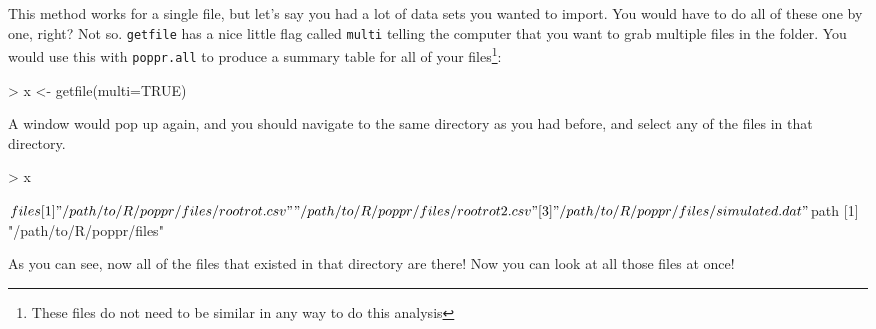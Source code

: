 \documentclass[letterpaper]{article}
\begin{document}
This method works for a single file, but let's say you had a lot of data sets you wanted to import. You would have to do all of these one by one, right? Not so. \texttt{getfile} has a nice little flag called \texttt{multi} telling the computer that you want to grab multiple files in the folder. You would use this with \texttt{poppr.all} to produce a summary table for all of your files\footnote{These files do not need to be similar in any way to do this analysis}:
\begin{Schunk}
\begin{Sinput}
> x <- getfile(multi=TRUE)
\end{Sinput}
\end{Schunk}
A window would pop up again, and you should navigate to the same directory as you had before, and select any of the files in that directory. 
\begin{Schunk}
\begin{Sinput}
> x
\end{Sinput}
\end{Schunk}
\begin{Schunk}
\begin{Soutput}
$files
[1] "/path/to/R/poppr/files/rootrot.csv"   "/path/to/R/poppr/files/rootrot2.csv" 
[3] "/path/to/R/poppr/files/simulated.dat"

$path
[1] "/path/to/R/poppr/files"
\end{Soutput}
\end{Schunk}
As you can see, now all of the files that existed in that directory are there! Now you can look at all those files at once!
\begin{Schunk}
\end{Schunk}
\end{document}
